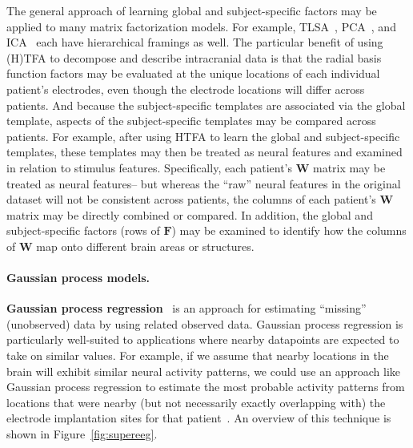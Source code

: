 \documentclass[runningheads]{llncs}
\begin{document}
The general approach of learning global and subject-specific factors
may be applied to many matrix factorization models.  For example,
TLSA~\citep{GersEtal11}, PCA~\citep{WestEtal98}, and
ICA~\citep{WangGuo19} each have hierarchical framings as well.  The
particular benefit of using (H)TFA to decompose and describe
intracranial data is that the radial basis function factors may be
evaluated at the unique locations of each individual patient's
electrodes, even though the electrode locations will differ across
patients.  And because the subject-specific templates are associated
via the global template, aspects of the subject-specific templates may
be compared across patients.  For example, after using HTFA to learn
the global and subject-specific templates, these templates may then be
treated as neural features and examined in relation to stimulus
features.  Specifically, each patient's $\mathbf{W}$ matrix may be
treated as neural features-- but whereas the ``raw'' neural features
in the original dataset will not be consistent across patients, the
columns of each patient's $\mathbf{W}$ matrix may be directly combined
or compared.  In addition, the global and subject-specific factors
(rows of $\mathbf{F}$) may be examined to identify how the columns of
$\mathbf{W}$ map onto different brain areas or structures.


\paragraph{Gaussian process models.}  \textbf{Gaussian process
  regression}~\citep{Rasm06} is an approach for estimating ``missing''
(unobserved) data by using related observed data.  Gaussian process
regression is particularly well-suited to applications where nearby
datapoints are expected to take on similar values.  For example, if we
assume that nearby locations in the brain will exhibit similar neural
activity patterns, we could use an approach like Gaussian process
regression to estimate the most probable activity patterns from
locations that were nearby (but not necessarily exactly overlapping
with) the electrode implantation sites for that
patient~\citep{OwenEtal20}.  An overview of this technique is shown in
Figure~\ref{fig:supereeg}.
\end{document}
